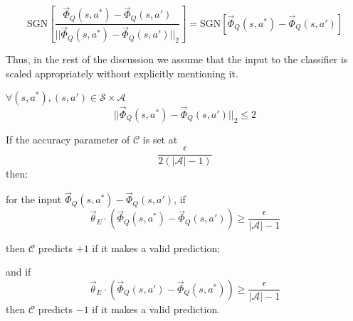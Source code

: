 \[
\text{SGN} \left[ \frac{\vec{\Phi}_Q(s,a^*) - \vec{\Phi}_Q(s,a')}{||\vec{\Phi}_Q(s,a^*) - \vec{\Phi}_Q(s,a') ||_2}\right]
=\text{SGN} \left[\vec{\Phi}_Q(s,a^*) - \vec{\Phi}_Q(s,a') \right] 
\]

 Thus, in the rest of the discussion we assume that the input to the classifier is scaled appropriately without explicitly mentioning it. \\
 
\begin{lemma}
\label{lemma:diam}
$\forall (s,a^*), (s,a') \in \mathcal{S} \times \mathcal{A}$
\begin{equation}
||\vec{\Phi}_Q(s,a^*) - \vec{\Phi}_Q(s,a') ||_2 \leq 2
\end{equation}
\end{lemma} 
 
 

\begin{thm}
\label{thm:kwik_converse}
If the accuracy parameter of $\mathcal{C}$ is set at
\[
\frac{\epsilon}{2(|\mathcal{A}|-1)}
\]
then:

 for the input $\vec{\Phi}_Q(s,a^*) - \vec{\Phi}_Q(s,a')$, if
\begin{equation}
\vec{\theta}_E \cdot (\vec{\Phi}_Q(s,a^*) - \vec{\Phi}_Q(s,a')) \geq  \frac{\epsilon}{|\mathcal{A}|-1}
\end{equation}

then $\mathcal{C}$ predicts $+1$ if it makes a valid prediction;

and if
\begin{equation}
\vec{\theta}_E \cdot (\vec{\Phi}_Q(s,a') - \vec{\Phi}_Q(s,a^*)) \geq  \frac{\epsilon}{|\mathcal{A}|-1}
\end{equation}
then $\mathcal{C}$ predicts $-1$ if it makes a valid prediction.

\end{thm} 
 
